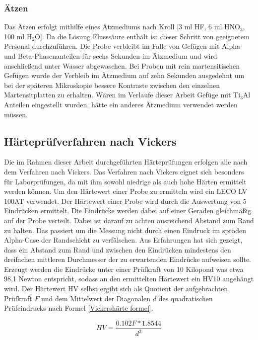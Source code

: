 \documentclass[a4paper, 11pt]{tubsreprt}
\begin{document}
\subsubsection{Ätzen}
Das Ätzen erfolgt mithilfe eines Ätzmediums nach Kroll [3 ml HF, 6 ml HNO$_{3}$, 100 ml H$_{2}$O]. Da die Lösung Flusssäure enthält ist dieser Schritt von geeignetem Personal durchzuführen. Die Probe verbleibt im Falle von Gefügen mit Alpha- und Beta-Phasenanteilen für sechs Sekunden im Ätzmedium und wird anschließend unter Wasser abgewaschen. Bei Proben mit rein martensitischen Gefügen wurde der Verbleib im Ätzmedium auf zehn Sekunden ausgedehnt um bei der späteren Mikroskopie bessere Kontraste zwischen den einzelnen Martensitplatten zu erhalten. Wären im Verlaufe dieser Arbeit Gefüge mit Ti$_{3}$Al Anteilen eingestellt wurden, hätte ein anderes Ätzmedium verwendet werden müssen.

\subsection{Härteprüfverfahren nach Vickers} \label{Kapitel Härte}
Die im Rahmen dieser Arbeit durchgeführten Härteprüfungen erfolgen alle nach dem Verfahren nach Vickers. Das Verfahren nach Vickers eignet sich besonders für Laborprüfungen, da mit ihm sowohl niedrige als auch hohe Härten ermittelt werden können. Um den Härtewert einer Probe zu ermitteln wird ein LECO LV 100AT verwendet. Der Härtewert einer Probe wird durch die Auswertung von 5 Eindrücken ermittelt. Die Eindrücke werden dabei auf einer Geraden gleichmäßig auf der Probe verteilt. Dabei ist darauf zu achten ausreichend Abstand zum Rand  zu halten. Das passiert um die Messung nicht durch einen Eindruck im spröden Alpha-Case der Randschicht zu verfälschen. Aus Erfahrungen hat sich gezeigt, dass ein Abstand zum Rand und zwischen den Eindrücken mindestens den dreifachen mittleren Durchmesser der zu erwartenden Eindrücke aufweisen sollte.
Erzeugt werden die Eindrücke unter einer Prüfkraft von 10 Kilopond was etwa 98,1 Newton entspricht, sodass an den ermittelten Härtewert ein HV10 angehängt wird. Der Härtewert HV selbst ergibt sich als Quotient der aufgebrachten Prüfkraft $F$ und dem Mittelwert der Diagonalen $d$ des quadratischen Prüfeindrucks  nach Formel \ref{Vickershärte formel}.

\begin{equation}
HV = \frac{ 0.102 F * 1.8544 }{ d^{ 2 } }
\label{Vickershärte formel}
\end{equation}
\end{document}
